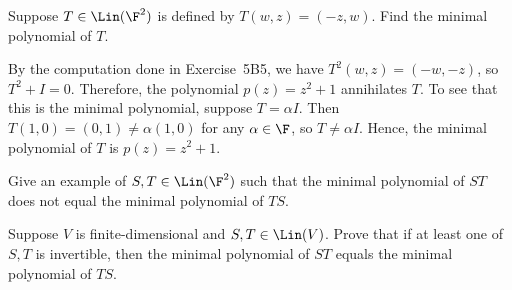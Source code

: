 \begin{exercise}
Suppose $T\in\Lin(\F^2)$ is defined by $T(w,z)=(-z,w)$. Find the minimal
polynomial of $T$.
\end{exercise}
\begin{solution}
By the computation done in Exercise~5B5, we have $T^2(w,z)=(-w,-z)$, so
$T^2+I=0$. Therefore, the polynomial $p(z)=z^2+1$ annihilates $T$. To see that
this is the minimal polynomial, suppose $T=\alpha I$. Then
$T(1,0)=(0,1)\ne\alpha(1,0)$ for any $\alpha\in\F$, so $T\ne\alpha I$. Hence,
the minimal polynomial of $T$ is $p(z)=z^2+1$.
\end{solution}

\begin{exercise}\leavevmode
\begin{parts}
\item Give an example of $S,T\in\Lin(\F^2)$ such that the minimal polynomial
  of $ST$ does not equal the minimal polynomial of $TS$.
\item Suppose $V$ is finite-dimensional and $S,T\in\Lin(V)$. Prove that if at
  least one of $S,T$ is invertible, then the minimal polynomial of $ST$ equals
  the minimal polynomial of $TS$.
\end{parts}
\end{exercise}
